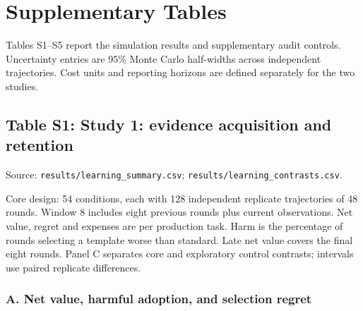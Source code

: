 \begingroup
\renewcommand{\arraystretch}{1.08}
\renewcommand{\footnotesize}{\fontsize{8}{10}\selectfont}
\section*{Supplementary Tables}
\label{sec:supplementary-tables}
Tables S1--S5 report the simulation results and supplementary audit controls. Uncertainty entries are 95\% Monte Carlo half-widths across independent trajectories. Cost units and reporting horizons are defined separately for the two studies.

\subsection*{Table S1: Study 1: evidence acquisition and retention}
\label{supp:S1}
{\footnotesize Source: \texttt{results/learning\_summary.csv}; \texttt{results/learning\_contrasts.csv}.}\par Core design: 54 conditions, each with 128 independent replicate trajectories of 48 rounds. Window 8 includes eight previous rounds plus current observations. Net value, regret and expenses are per production task. Harm is the percentage of rounds selecting a template worse than standard. Late net value covers the final eight rounds. Panel C separates core and exploratory control contrasts; intervals use paired replicate differences.

\subsubsection*{A. Net value, harmful adoption, and selection regret}
\begingroup\footnotesize\setlength{\tabcolsep}{4pt}

